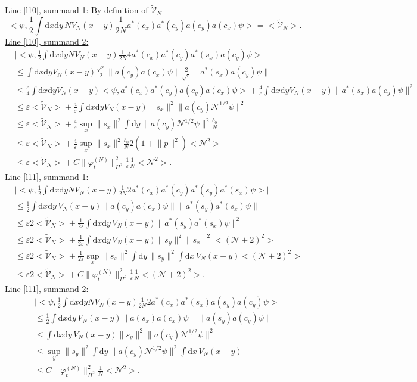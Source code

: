 \documentclass[11pt,a4paper,draft,DIV11]{scrartcl}	%
\newcommand{\di}{\textrm{d}}		%
\newcommand{\Ncal}{\mathcal{N}}		%
\newcommand{\tilV}{\tilde{\mathcal{V}}_N}		%
\newcommand{\estlist}[2]{\underline{Line \ref{l#1}, summand #2:}}
\newcommand{\scal}[2]{\big<#1,#2\big>} %
\newcommand{\norm}[1]{\lVert#1\rVert}	%
\newcommand{\ev}[1]{\big<#1\big>}	%
\newcommand{\ph}{\varphi_t^{(N)}}	%
\newcommand{\dxyNV}{\frac{1}{2}\int \di x\di y N V_N(x-y)} %
\newcommand{\bd}{\begin{displaymath}}			%
\newcommand{\ed}{\end{displaymath}}
\begin{document}
\estlist{10}{1}
By definition of $\tilV$
\bd
\scal{\psi}{\frac{1}{2}\int \di x\di y\, NV_N(x-y)\frac{1}{2N} a^\ast(c_x) a^\ast(c_y) a(c_y) a(c_x)\psi} = \ev{\tilV}.
\ed
\estlist{10}{2}
\begin{align*}
 & \lvert \scal{\psi}{\dxyNV \frac{1}{2N} 4 a^\ast(c_x)a^\ast(c_y) a^\ast(s_x)a(c_y)\psi}\rvert \\
& \leq \int \di x\di y V_N(x-y) \frac{\sqrt{\varepsilon}}{2} \norm{a(c_y) a(c_x)\psi} \frac{2}{\sqrt{\varepsilon}} \norm{a^\ast(s_x)a(c_y)\psi} \\
& \leq \frac{\varepsilon}{4} \int \di x\di y V_N(x-y) \scal{\psi}{a^\ast(c_x)a^\ast(c_y)a(c_y)a(c_x)\psi} + \frac{4}{\varepsilon} \int \di x\di y V_N(x-y) \norm{a^\ast(s_x)a(c_y)\psi}^2 \\
& \leq \varepsilon \ev{\tilV} + \frac{4}{\varepsilon}\int \di x\di y V_N(x-y) \norm{s_x}^2 \norm{a(c_y)\Ncal^{1/2}\psi}^2 \\
& \leq \varepsilon \ev{\tilV} + \frac{4}{\varepsilon} \sup_x \norm{s_x}^2 \int \di y\, \norm{a(c_y)\Ncal^{1/2}\psi}^2 \frac{b_0}{N}\\
& \leq \varepsilon \ev{\tilV} + \frac{4}{\varepsilon} \sup_x \norm{s_x}^2 \frac{b_0}{N} 2 (1+\norm{p}^2)\ev{\Ncal^2} \\
& \leq \varepsilon \ev{\tilV} + C\norm{\ph}_{H^2}^2 \frac{1}{\varepsilon} \frac{1}{N}\ev{\Ncal^2}.
\end{align*}
\estlist{11}{1}
\begin{align*}
& \lvert \scal{\psi}{\dxyNV \frac{1}{2N}2a^\ast(c_x)a^\ast(c_y) a^\ast(s_y) a^\ast(s_x) \psi}\rvert \\
& \leq \frac{1}{2}\int \di x\di y\, V_N(x-y)  \norm{a(c_y)a(c_x)\psi} \norm{a^\ast(s_y)a^\ast(s_x)\psi} \\
& \leq \varepsilon 2 \ev{\tilV} + \frac{1}{2\varepsilon} \int \di x\di y\, V_N(x-y) \norm{a^\ast(s_y)a^\ast(s_x)\psi}^2 \\
& \leq \varepsilon 2 \ev{\tilV} + \frac{1}{2\varepsilon} \int \di x\di y\, V_N(x-y) \norm{s_y}^2 \norm{s_x}^2 \ev{(\Ncal+2)^2} \\
& \leq \varepsilon 2 \ev{\tilV} + \frac{1}{2\varepsilon} \sup_x \norm{s_x}^2 \int \di y\, \norm{s_y}^2 \int \di x\, V_N(x-y) \ev{(\Ncal+2)^2} \\
& \leq \varepsilon 2\ev{\tilV} + C\norm{\ph}_{H^2}^2 \frac{1}{\varepsilon} \frac{1}{N}\ev{(\Ncal+2)^2}.
\end{align*}
\estlist{11}{2}
\begin{align*}
& \lvert \scal{\psi}{\dxyNV \frac{1}{2N} 2 a^\ast(c_x) a^\ast(s_x) a(s_y) a(c_y)\psi}\rvert \\
& \leq \frac{1}{2}\int \di x\di y\, V_N(x-y) \norm{a(s_x) a(c_x) \psi} \norm{a(s_y) a(c_y)\psi} \\
& \leq \int \di x\di y\, V_N(x-y) \norm{s_y}^2 \norm{a(c_y) \Ncal^{1/2}\psi}^2\\
& \leq \sup_y \norm{s_y}^2 \int \di y\, \norm{a(c_y)\Ncal^{1/2}\psi}^2 \int \di x\, V_N(x-y)\\
& \leq C \norm{\ph}_{H^2}^2 \frac{1}{N}\ev{\Ncal^2}.
\end{align*}
\end{document}
